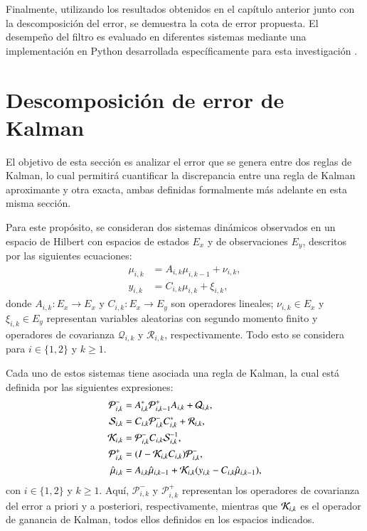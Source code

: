 Finalmente, utilizando los resultados obtenidos en el capítulo anterior junto con la descomposición del error, se demuestra la cota de error propuesta. El desempeño del filtro es evaluado en diferentes sistemas mediante una implementación en Python desarrollada específicamente para esta investigación \cite{Olguin2024KKKF:Filter}.

\section{Descomposición de error de Kalman}

El objetivo de esta sección es analizar el error que se genera entre dos reglas de Kalman, lo cual permitirá cuantificar la discrepancia entre una regla de Kalman aproximante y otra exacta, ambas definidas formalmente más adelante en esta misma sección. 

Para este propósito, se consideran dos sistemas dinámicos observados en un espacio de Hilbert con espacios de estados $E_x$ y de observaciones $E_y$, descritos por las siguientes ecuaciones:  
\begin{equation*}
	\begin{aligned}
		\mu_{i,k}  &= A_{i,k} \mu_{i,k-1} + \nu_{i,k}, \\
		y_{i,k} &= C_{i,k} \mu_{i,k} + \xi_{i,k},
	\end{aligned}
\end{equation*}
donde $A_{i,k} : E_x \to E_x$ y $C_{i,k}: E_x \to E_y$ son operadores lineales; $\nu_{i,k} \in E_x$ y $\xi_{i,k} \in E_y$ representan variables aleatorias con segundo momento finito y operadores de covarianza $\mathcal{Q}_{i,k}$ y $\mathcal{R}_{i,k}$, respectivamente. Todo esto se considera para $i \in \{1,2\}$ y $k \geq 1$.

Cada uno de estos sistemas tiene asociada una regla de Kalman, la cual está definida por las siguientes expresiones:  
\begin{equation*}
	\begin{aligned}
		\mathcal{P}_{i,k}^- &= A_{i,k}^* \mathcal{P}_{i,k-1}^+ A_{i,k} + \mathcal{Q}_{i,k}, \\
		\mathcal{S}_{i,k} &= C_{i,k} \mathcal{P}_{i,k}^- C_{i,k}^* + \mathcal{R}_{i,k}, \\
		\mathcal{K}_{i,k} &= \mathcal{P}_{i,k}^- C_{i,k} \mathcal{S}_{i,k}^{-1}, \\
		\mathcal{P}_{i,k}^+ &= (I - \mathcal{K}_{i,k} C_{i,k}) \mathcal{P}_{i,k}^-, \\
		\hat{\mu}_{i,k} &= A_{i,k} \hat{\mu}_{i,k-1} + \mathcal{K}_{i,k} (y_{i,k} - C_{i,k} \hat{\mu}_{i,k-1}),
	\end{aligned}
\end{equation*}
con $i \in \{1,2\}$ y $k \geq 1$. Aquí, $\mathcal{P}_{i,k}^-$ y $\mathcal{P}_{i,k}^+$ representan los operadores de covarianza del error a priori y a posteriori, respectivamente, mientras que $\mathcal{K}_{i,k}$ es el operador de ganancia de Kalman, todos ellos definidos en los espacios indicados.

